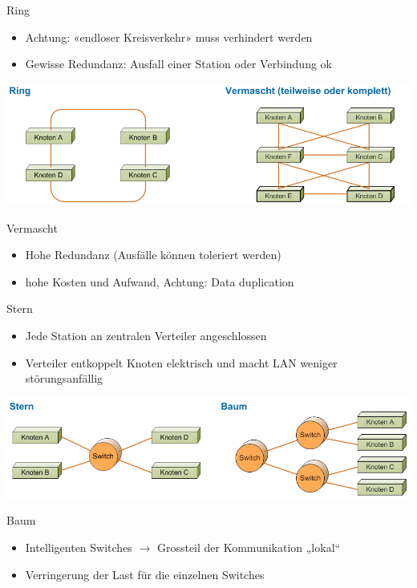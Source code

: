 \begin{definition}{Ring}
    \begin{itemize}
        \item Achtung: «endloser Kreisverkehr» muss verhindert werden
        \item Gewisse Redundanz: Ausfall einer Station oder Verbindung ok
    \end{itemize}
\end{definition}

 
    \centering
    \includegraphics[width=0.9\linewidth]{images/ring_vermascht_topo.png}
 

\begin{definition}{Vermascht}
    \begin{itemize}
        \item Hohe Redundanz (Ausfälle können toleriert werden)
        \item hohe Kosten und Aufwand, Achtung: Data duplication
    \end{itemize}
\end{definition}

\begin{definition}{Stern}
\begin{itemize}
    \item Jede Station an zentralen Verteiler angeschlossen
    \item Verteiler entkoppelt Knoten elektrisch und macht LAN weniger störungsanfällig
\end{itemize}
\end{definition}

 
    \centering
    \includegraphics[width=0.9\linewidth]{images/stern_baum_topo.png}
 

\begin{definition}{Baum}
    \begin{itemize}
        \item Intelligenten Switches $\rightarrow$ Grossteil der Kommunikation „lokal“
        \item Verringerung der Last für die einzelnen Switches
    \end{itemize}
\end{definition}

